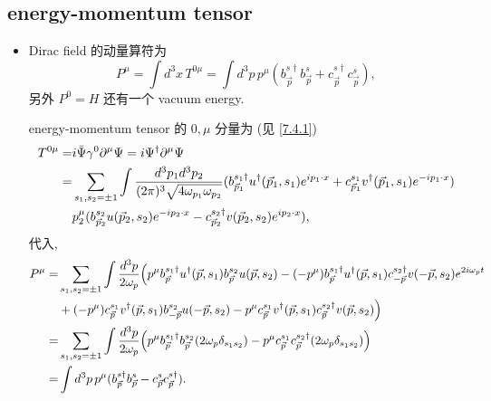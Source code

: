 \subsection{energy-momentum tensor}
\begin{itemize}
	\item Dirac field 的动量算符为
	\begin{equation}
		P^\mu = \int d^3 x \, T^{0 \mu} = \int d^3 p \, p^\mu (b^{s \dag}_{\vec{p}} b^s_{\vec{p}} + c^{s \dag}_{\vec{p}} c^s_{\vec{p}}),
	\end{equation}
	另外 $P^0 = H$ 还有一个 vacuum energy.
	
	\begin{tcolorbox}[title=calculation:]
		energy-momentum tensor 的 $0, \mu$ 分量为 (见 \eqref{7.4.1})
		\begin{align}
			T^{0 \mu} =& i \bar{\Psi} \gamma^0 \partial^\mu \Psi = i \Psi^\dag \partial^\mu \Psi \notag \\
			=& \sum_{s_1, s_2 = \pm 1} \int \frac{d^3 p_1 d^3 p_2}{(2 \pi)^3 \sqrt{4 \omega_{p_1} \omega_{p_2}}} (b^{s_1 \dag}_{\vec{p}_1} u^\dag(\vec{p}_1, s_1) e^{i p_1 \cdot x} + c^{s_1}_{\vec{p}_1} v^\dag(\vec{p}_1, s_1) e^{- i p_1 \cdot x}) \notag \\
			& p_2^\mu (b^{s_2}_{\vec{p}_2} u(\vec{p}_2, s_2) e^{- i p_2 \cdot x} - c^{s_2 \dag}_{\vec{p}_2} v(\vec{p}_2, s_2) e^{i p_2 \cdot x}),
		\end{align}
		代入,
		\begin{align}
			P^\mu =& \sum_{s_1, s_2 = \pm 1} \int \frac{d^3 p}{2 \omega_p} \Big( p^\mu b^{s_1 \dag}_{\vec{p}} u^\dag(\vec{p}, s_1) b^{s_2}_{\vec{p}} u(\vec{p}, s_2) - (- p^\mu) b^{s_1 \dag}_{\vec{p}} u^\dag(\vec{p}, s_1) c^{s_2 \dag}_{- \vec{p}} v(- \vec{p}, s_2) e^{2 i \omega_p t} \notag \\
			& + (- p^\mu) c^{s_1}_{\vec{p}} v^\dag(\vec{p}, s_1) b^{s_2}_{- \vec{p}} u(- \vec{p}, s_2) - p^\mu c^{s_1}_{\vec{p}} v^\dag(\vec{p}, s_1) c^{s_2 \dag}_{\vec{p}} v(\vec{p}, s_2) \Big) \notag \\
			=& \sum_{s_1, s_2 = \pm 1} \int \frac{d^3 p}{2 \omega_p} \Big( p^\mu b^{s_1 \dag}_{\vec{p}} b^{s_2}_{\vec{p}} (2 \omega_p \delta_{s_1 s_2}) - p^\mu c^{s_1}_{\vec{p}} c^{s_2 \dag}_{\vec{p}} (2 \omega_p \delta_{s_1 s_2}) \Big) \notag \\
			=& \int d^3 p \, p^\mu (b^{s \dag}_{\vec{p}} b^s_{\vec{p}} - c^s_{\vec{p}} c^{s \dag}_{\vec{p}}).
		\end{align}
	\end{tcolorbox}
\end{itemize}


